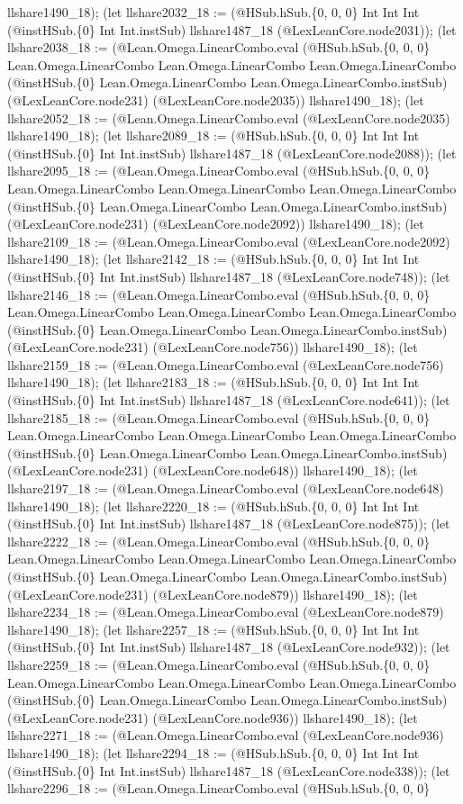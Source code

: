 \documentclass[11pt]{article}
\begin{document}
llshare1490\_18); (let llshare2032\_18 := (@HSub.hSub.\{0, 0, 0\} Int Int Int (@instHSub.\{0\} Int Int.instSub) llshare1487\_18 (@LexLeanCore.node2031)); (let llshare2038\_18 := (@Lean.Omega.LinearCombo.eval (@HSub.hSub.\{0, 0, 0\} Lean.Omega.LinearCombo Lean.Omega.LinearCombo Lean.Omega.LinearCombo (@instHSub.\{0\} Lean.Omega.LinearCombo Lean.Omega.LinearCombo.instSub) (@LexLeanCore.node231) (@LexLeanCore.node2035)) llshare1490\_18); (let llshare2052\_18 := (@Lean.Omega.LinearCombo.eval (@LexLeanCore.node2035) llshare1490\_18); (let llshare2089\_18 := (@HSub.hSub.\{0, 0, 0\} Int Int Int (@instHSub.\{0\} Int Int.instSub) llshare1487\_18 (@LexLeanCore.node2088)); (let llshare2095\_18 := (@Lean.Omega.LinearCombo.eval (@HSub.hSub.\{0, 0, 0\} Lean.Omega.LinearCombo Lean.Omega.LinearCombo Lean.Omega.LinearCombo (@instHSub.\{0\} Lean.Omega.LinearCombo Lean.Omega.LinearCombo.instSub) (@LexLeanCore.node231) (@LexLeanCore.node2092)) llshare1490\_18); (let llshare2109\_18 := (@Lean.Omega.LinearCombo.eval (@LexLeanCore.node2092) llshare1490\_18); (let llshare2142\_18 := (@HSub.hSub.\{0, 0, 0\} Int Int Int (@instHSub.\{0\} Int Int.instSub) llshare1487\_18 (@LexLeanCore.node748)); (let llshare2146\_18 := (@Lean.Omega.LinearCombo.eval (@HSub.hSub.\{0, 0, 0\} Lean.Omega.LinearCombo Lean.Omega.LinearCombo Lean.Omega.LinearCombo (@instHSub.\{0\} Lean.Omega.LinearCombo Lean.Omega.LinearCombo.instSub) (@LexLeanCore.node231) (@LexLeanCore.node756)) llshare1490\_18); (let llshare2159\_18 := (@Lean.Omega.LinearCombo.eval (@LexLeanCore.node756) llshare1490\_18); (let llshare2183\_18 := (@HSub.hSub.\{0, 0, 0\} Int Int Int (@instHSub.\{0\} Int Int.instSub) llshare1487\_18 (@LexLeanCore.node641)); (let llshare2185\_18 := (@Lean.Omega.LinearCombo.eval (@HSub.hSub.\{0, 0, 0\} Lean.Omega.LinearCombo Lean.Omega.LinearCombo Lean.Omega.LinearCombo (@instHSub.\{0\} Lean.Omega.LinearCombo Lean.Omega.LinearCombo.instSub) (@LexLeanCore.node231) (@LexLeanCore.node648)) llshare1490\_18); (let llshare2197\_18 := (@Lean.Omega.LinearCombo.eval (@LexLeanCore.node648) llshare1490\_18); (let llshare2220\_18 := (@HSub.hSub.\{0, 0, 0\} Int Int Int (@instHSub.\{0\} Int Int.instSub) llshare1487\_18 (@LexLeanCore.node875)); (let llshare2222\_18 := (@Lean.Omega.LinearCombo.eval (@HSub.hSub.\{0, 0, 0\} Lean.Omega.LinearCombo Lean.Omega.LinearCombo Lean.Omega.LinearCombo (@instHSub.\{0\} Lean.Omega.LinearCombo Lean.Omega.LinearCombo.instSub) (@LexLeanCore.node231) (@LexLeanCore.node879)) llshare1490\_18); (let llshare2234\_18 := (@Lean.Omega.LinearCombo.eval (@LexLeanCore.node879) llshare1490\_18); (let llshare2257\_18 := (@HSub.hSub.\{0, 0, 0\} Int Int Int (@instHSub.\{0\} Int Int.instSub) llshare1487\_18 (@LexLeanCore.node932)); (let llshare2259\_18 := (@Lean.Omega.LinearCombo.eval (@HSub.hSub.\{0, 0, 0\} Lean.Omega.LinearCombo Lean.Omega.LinearCombo Lean.Omega.LinearCombo (@instHSub.\{0\} Lean.Omega.LinearCombo Lean.Omega.LinearCombo.instSub) (@LexLeanCore.node231) (@LexLeanCore.node936)) llshare1490\_18); (let llshare2271\_18 := (@Lean.Omega.LinearCombo.eval (@LexLeanCore.node936) llshare1490\_18); (let llshare2294\_18 := (@HSub.hSub.\{0, 0, 0\} Int Int Int (@instHSub.\{0\} Int Int.instSub) llshare1487\_18 (@LexLeanCore.node338)); (let llshare2296\_18 := (@Lean.Omega.LinearCombo.eval (@HSub.hSub.\{0, 0, 0\} 
\end{document}
